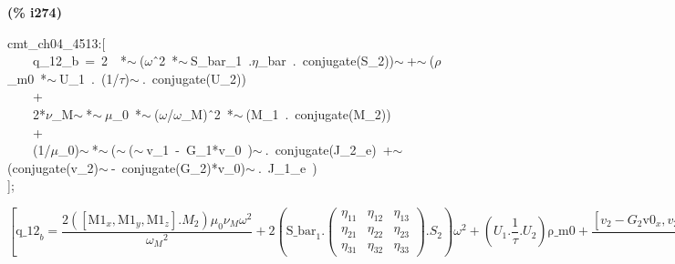 \documentclass[fleqn]{article}
\begin{document}
\noindent
\begin{minipage}[t]{4.000000em}\color{red}\bfseries
(\% i274)	
\end{minipage}
\begin{minipage}[t]{\textwidth}\color{blue}
cmt\_ch04\_4513:[\\
\ \ \ \ q\_12\_b\ =\ 2\ \ *\ensuremath{\sim\ }(\ensuremath{\omega}\^\ 2\ *\ensuremath{\sim\ }S\_bar\_1\ .\ensuremath{\eta}\_bar\ .\ conjugate(S\_2))\ensuremath{\sim\ }+\ensuremath{\sim\ }(\ensuremath{\rho}\_m0\ *\ensuremath{\sim\ }U\_1\ .\ (1/\ensuremath{\tau})\ensuremath{\sim\ }.\ conjugate(U\_2))\\
\ \ \ \ +\\
\ \ \ \ 2*\ensuremath{\nu}\_M\ensuremath{\sim\ }*\ensuremath{\sim\ }\ensuremath{\mu}\_0\ *\ensuremath{\sim\ }(\ensuremath{\omega}/\ensuremath{\omega}\_M)\^\ 2\ *\ensuremath{\sim\ }(M\_1\ .\ conjugate(M\_2))\\
\ \ \ \ +\\
\ \ \ \ (1/\ensuremath{\mu}\_0)\ensuremath{\sim\ }*\ensuremath{\sim\ }(\ensuremath{\sim\ }(\ensuremath{\sim\ }v\_1\ -\ G\_1*v\_0\ )\ensuremath{\sim\ }.\ conjugate(J\_2\_e)\ +\ensuremath{\sim\ }(conjugate(v\_2)\ensuremath{\sim\ }-\ conjugate(G\_2)*v\_0)\ensuremath{\sim\ }.\ J\_1\_e\ )\\
];
\end{minipage}
\[\displaystyle \tag{\% o274} 
\operatorname{[}{{\ensuremath{\mathrm{q\_ 12}}}_b}=\frac{2 \left( \left[ {{\ensuremath{\mathrm{M1}}}_x}\operatorname{,}{{\ensuremath{\mathrm{M1}}}_y}\operatorname{,}{{\ensuremath{\mathrm{M1}}}_z}\right] \ensuremath{\mathrm{ . }}{M_2}\right)  {{\mu }_0} {{\nu }_M} {{\omega }^{2}}}{{{{{\omega }_M}}^{2}}}+2 \left( {{\ensuremath{\mathrm{S\_ bar}}}_1}\ensuremath{\mathrm{ . }}\begin{pmatrix}{{\eta }_{\ensuremath{\mathrm{11}}}} & {{\eta }_{\ensuremath{\mathrm{12}}}} & {{\eta }_{\ensuremath{\mathrm{13}}}}\\
{{\eta }_{\ensuremath{\mathrm{21}}}} & {{\eta }_{\ensuremath{\mathrm{22}}}} & {{\eta }_{\ensuremath{\mathrm{23}}}}\\
{{\eta }_{\ensuremath{\mathrm{31}}}} & {{\eta }_{\ensuremath{\mathrm{32}}}} & {{\eta }_{\ensuremath{\mathrm{33}}}}\end{pmatrix}\ensuremath{\mathrm{ . }}{S_2}\right)  {{\omega }^{2}}+\left( {U_1}\ensuremath{\mathrm{ . }}\frac{1}{\tau }\ensuremath{\mathrm{ . }}{U_2}\right)  \ensuremath{\mathrm{\rho \_ m0}}+
\frac{\left[ {v_2}-{G_2} {{\ensuremath{\mathrm{v0}}}_x}\operatorname{,}{v_2}-{G_2} {{\ensuremath{\mathrm{v0}}}_y}\operatorname{,}{v_2}-{G_2} {{\ensuremath{\mathrm{v0}}}_z}\right] \ensuremath{\mathrm{ . }}{{\ensuremath{\mathrm{J\_ 1}}}_e}+\left[ {v_1}-{G_1} {{\ensuremath{\mathrm{v0}}}_x}\operatorname{,}{v_1}-{G_1} {{\ensuremath{\mathrm{v0}}}_y}\operatorname{,}{v_1}-{G_1} {{\ensuremath{\mathrm{v0}}}_z}\right] \ensuremath{\mathrm{ . }}{{\ensuremath{\mathrm{J\_ 2}}}_e}}{{{\mu }_0}}\operatorname{]}\mbox{}
\]
\end{document}
